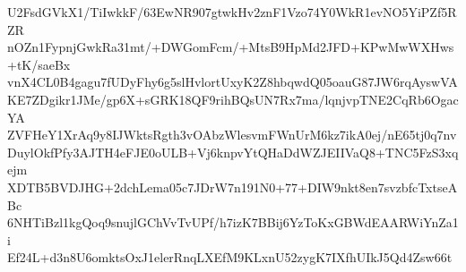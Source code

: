 U2FsdGVkX1/TiIwkkF/63EwNR907gtwkHv2znF1Vzo74Y0WkR1evNO5YiPZf5RZR
nOZn1FypnjGwkRa31mt/+DWGomFcm/+MtsB9HpMd2JFD+KPwMwWXHws+tK/saeBx
vnX4CL0B4gagu7fUDyFhy6g5slHvlortUxyK2Z8hbqwdQ05oauG87JW6rqAyswVA
KE7ZDgikr1JMe/gp6X+sGRK18QF9rihBQsUN7Rx7ma/lqnjvpTNE2CqRb6OgacYA
ZVFHeY1XrAq9y8IJWktsRgth3vOAbzWlesvmFWnUrM6kz7ikA0ej/nE65tj0q7nv
DuylOkfPfy3AJTH4eFJE0oULB+Vj6knpvYtQHaDdWZJEIIVaQ8+TNC5FzS3xqejm
XDTB5BVDJHG+2dchLema05c7JDrW7n191N0+77+DIW9nkt8en7svzbfcTxtseABc
6NHTiBzl1kgQoq9snujlGChVvTvUPf/h7izK7BBij6YzToKxGBWdEAARWiYnZa1i
Ef24L+d3n8U6omktsOxJ1elerRnqLXEfM9KLxnU52zygK7IXfhUIkJ5Qd4Zsw66t
